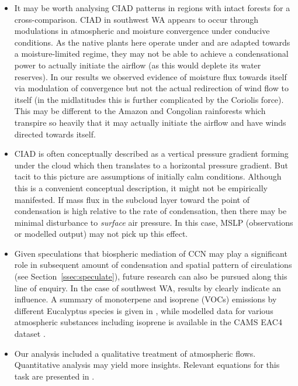 \begin{itemize}
	\item It may be worth analysing \ac{CIAD} patterns in regions with intact forests for a cross-comparison. \ac{CIAD} in southwest \ac{WA} appears to occur through modulations in atmospheric and moisture convergence under conducive conditions. As the native plants here operate under and are adapted towards a moisture-limited regime, they may not be able to achieve a condensational power to actually initiate the airflow (as this would deplete its water reserves). In our results we observed evidence of moisture flux towards itself via modulation of convergence but not the actual redirection of wind flow to itself (in the midlatitudes this is further complicated by the Coriolis force). This may be different to the Amazon and Congolian rainforests which transpire so heavily that it may actually initiate the airflow and have winds directed towards itself.
	\item \ac{CIAD} is often conceptually described as a vertical pressure gradient forming under the cloud which then translates to a horizontal pressure gradient. But tacit to this picture are assumptions of initially calm conditions. Although this is a convenient conceptual description, it might not be empirically manifested. If mass flux in the subcloud layer toward the point of condensation is high relative to the rate of condensation, then there may be minimal disturbance to \textit{surface} air pressure. In this case, \ac{MSLP} (observations or modelled output) may not pick up this effect.
	\item Given speculations that biospheric mediation of \ac{CCN} may play a significant role in subsequent amount of condensation and spatial pattern of circulations (see Section~\ref{ssec:speculate}), future research can also be pursued along this line of enquiry. In the case of southwest \ac{WA}, results by \citet{junkermann2009} clearly indicate an influence. A summary of monoterpene and isoprene (\acp{VOC}) emissions by different Eucalyptus species is given in \citep{he2000_monoterpene}, while modelled data for various atmospheric substances including isoprene is available in the \ac{CAMS} \ac{EAC4} dataset \citep{eac4}.
	\item Our analysis included a qualitative treatment of atmospheric flows. Quantitative analysis may yield more insights. Relevant equations for this task are presented in \citet{makarieva2014, makarieva2017}.
\end{itemize}